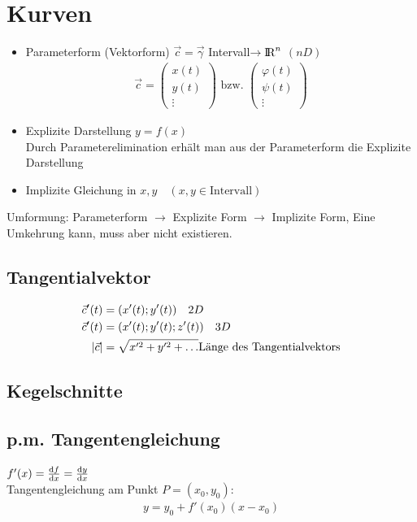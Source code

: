 \section{Kurven}
\begin{itemize}
\item Parameterform (Vektorform) $\vec{c}=\vec{\gamma}$ Intervall$\rightarrow\text{\rmfamily I\!R}^n$ $(nD)$
\begin{align*}
	\vec{c}=\begin{pmatrix}x(t) \\y(t)\\\vdots\end{pmatrix} \text{ bzw. } \begin{pmatrix}\varphi(t) \\\psi(t)\\\vdots\end{pmatrix}
\end{align*}
\item Explizite Darstellung $y=f(x)$ \\
	Durch Parameterelimination erhält man aus der Parameterform die Explizite Darstellung
\item Implizite Gleichung in $x,y\quad (x,y\in \text{Intervall})$
\end{itemize}
Umformung: Parameterform $\rightarrow$ Explizite Form $\rightarrow$ Implizite Form, Eine Umkehrung kann, muss aber nicht existieren. 

\subsection{Tangentialvektor}
\begin{align*}
\vec{c}'(t)&=(x'(t);y'(t)) \quad 2D\\
\vec{c}'(t)&=(x'(t);y'(t);z'(t)) \quad 3D\\
\lvert \vec{c}\rvert&= \sqrt{x'^2+ y'^2+\dots} \text{Länge des Tangentialvektors} 
\end{align*}

\subsection{Kegelschnitte}

\subsection{p.m. Tangentengleichung}
$f'(x) =\frac{\mathrm{d}f}{\mathrm{d}x}=\frac{\mathrm{d}y}{\mathrm{d}x}$\\
Tangentengleichung am Punkt $P=(x_0,y_0)$:
\begin{align*}
	y=y_0+f'(x_0)(x-x_0)
\end{align*}

